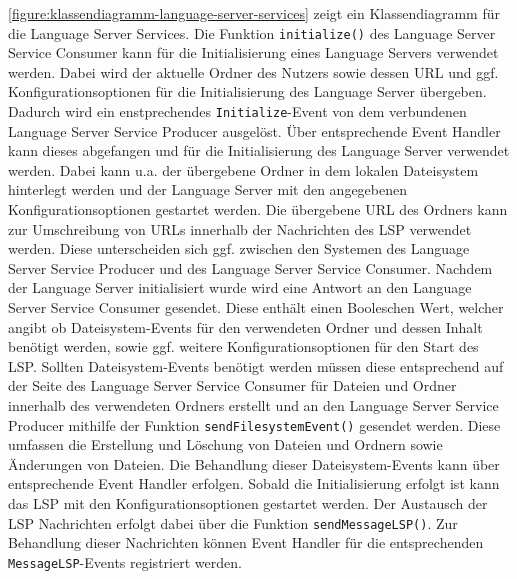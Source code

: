 \autoref{figure:klassendiagramm-language-server-services} zeigt ein Klassendiagramm für die Language Server Services. Die Funktion \texttt{initialize()} des Language Server Service Consumer kann für die Initialisierung eines Language Servers verwendet werden. Dabei wird der aktuelle Ordner des Nutzers sowie dessen URL und ggf. Konfigurationsoptionen für die Initialisierung des Language Server übergeben. Dadurch wird ein enstprechendes \texttt{Initialize}-Event von dem verbundenen Language Server Service Producer ausgelöst. Über entsprechende Event Handler kann dieses abgefangen und für die Initialisierung des Language Server verwendet werden. Dabei kann u.a. der übergebene Ordner in dem lokalen Dateisystem hinterlegt werden und der Language Server mit den angegebenen Konfigurationsoptionen gestartet werden. Die übergebene URL des Ordners kann zur Umschreibung von URLs innerhalb der Nachrichten des \ac{LSP} verwendet werden. Diese unterscheiden sich ggf. zwischen den Systemen des Language Server Service Producer und des Language Server Service Consumer. Nachdem der Language Server initialisiert wurde wird eine Antwort an den Language Server Service Consumer gesendet. Diese enthält einen Booleschen Wert, welcher angibt ob Dateisystem-Events für den verwendeten Ordner und dessen Inhalt benötigt werden, sowie ggf. weitere Konfigurationsoptionen für den Start des \ac{LSP}. Sollten Dateisystem-Events benötigt werden müssen diese entsprechend auf der Seite des Language Server Service Consumer für Dateien und Ordner innerhalb des verwendeten Ordners erstellt und an den Language Server Service Producer mithilfe der Funktion \texttt{sendFilesystemEvent()} gesendet werden. Diese umfassen die Erstellung und Löschung von Dateien und Ordnern sowie Änderungen von Dateien. Die Behandlung dieser Dateisystem-Events kann über entsprechende Event Handler erfolgen. Sobald die Initialisierung erfolgt ist kann das \ac{LSP} mit den Konfigurationsoptionen gestartet werden. Der Austausch der \ac{LSP} Nachrichten erfolgt dabei über die Funktion \texttt{sendMessageLSP()}. Zur Behandlung dieser Nachrichten können Event Handler für die entsprechenden \texttt{MessageLSP}-Events registriert werden.
